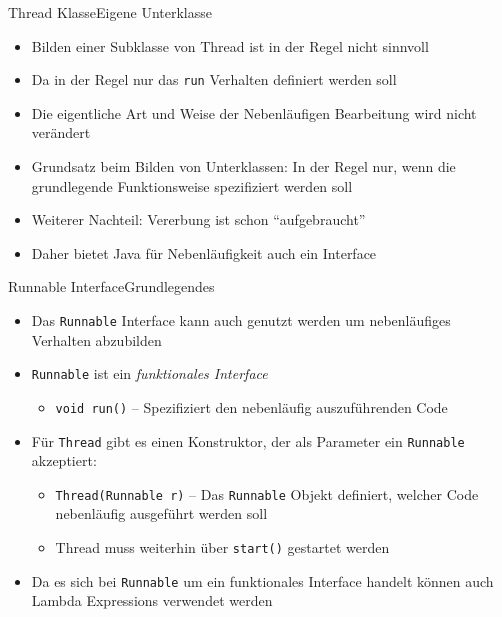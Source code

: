 \begin{frame}{Thread Klasse}{Eigene Unterklasse}
    \begin{itemize}
        \item Bilden einer Subklasse von Thread ist in der Regel nicht sinnvoll
        \item Da in der Regel nur das \texttt{run} Verhalten definiert werden soll
        \item Die eigentliche Art und Weise der Nebenläufigen Bearbeitung wird nicht verändert
        \item Grundsatz beim Bilden von Unterklassen: In der Regel nur, wenn die grundlegende Funktionsweise spezifiziert werden soll
        \item Weiterer Nachteil: Vererbung ist schon "`aufgebraucht"'
        \item Daher bietet Java für Nebenläufigkeit auch ein Interface
    \end{itemize}
\end{frame}

\begin{frame}{Runnable Interface}{Grundlegendes}
    \begin{itemize}
        \item Das \texttt{Runnable} Interface kann auch genutzt werden um nebenläufiges Verhalten abzubilden
        \item \texttt{Runnable} ist ein \textit{funktionales Interface}
        \begin{itemize}
            \item \texttt{void run()} -- Spezifiziert den nebenläufig auszuführenden Code
        \end{itemize}
        \item Für \texttt{Thread} gibt es einen Konstruktor, der als Parameter ein \texttt{Runnable} akzeptiert:
        \begin{itemize}
            \item \texttt{Thread(Runnable r)} -- Das \texttt{Runnable} Objekt definiert, welcher Code nebenläufig ausgeführt werden soll
            \item Thread muss weiterhin über \texttt{start()} gestartet werden
        \end{itemize}
        \item Da es sich bei \texttt{Runnable} um ein funktionales Interface handelt können auch Lambda Expressions verwendet werden
    \end{itemize}
\end{frame}

